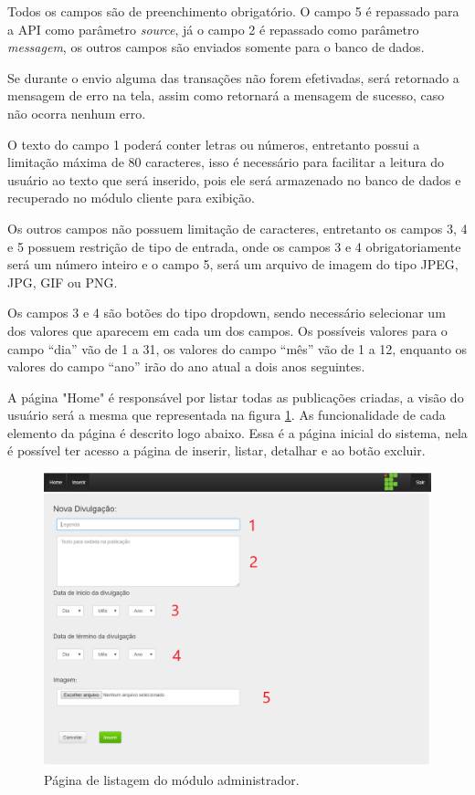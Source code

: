 Todos os campos são de preenchimento obrigatório. O campo 5 é repassado para a API como parâmetro \textit{source}, já o campo 2 é repassado como parâmetro \textit{messagem}, os outros campos são enviados somente para o banco de dados.

Se durante o envio alguma das transações não forem efetivadas, será retornado a mensagem de erro na tela, assim como retornará a mensagem de sucesso, caso não ocorra nenhum erro.

O texto do campo 1 poderá conter letras ou números, entretanto possui a limitação máxima de 80 caracteres, isso é necessário para facilitar a leitura do usuário ao texto que será inserido, pois ele será armazenado no banco de dados e recuperado no módulo cliente para exibição.

Os outros campos não possuem limitação de caracteres, entretanto os campos 3, 4 e 5 possuem restrição de tipo de entrada, onde os campos 3 e 4 obrigatoriamente será um número inteiro e o campo 5, será um arquivo de imagem do tipo JPEG, JPG, GIF ou PNG.

Os campos 3 e 4 são botões do tipo dropdown, sendo necessário selecionar um dos valores que aparecem em cada um dos campos. Os possíveis valores para o campo ``dia'' vão de 1 a 31, os valores do campo ``mês'' vão de 1 a 12, enquanto os valores do campo ``ano'' irão do ano atual a dois anos seguintes.

A página "Home" é responsável por listar todas as publicações criadas, a visão do usuário será a mesma que representada na figura \ref{fig:administrador2}. As funcionalidade de cada elemento da página é descrito logo abaixo. Essa é a página inicial do sistema, nela é possível ter acesso a página de inserir, listar, detalhar e ao botão excluir.

\begin{figure}[H]
\centering
\includegraphics[scale=0.3]{figuras/administrador1}
\caption{Página de listagem  do módulo administrador.}
\label{fig:administrador2}
\end{figure}

